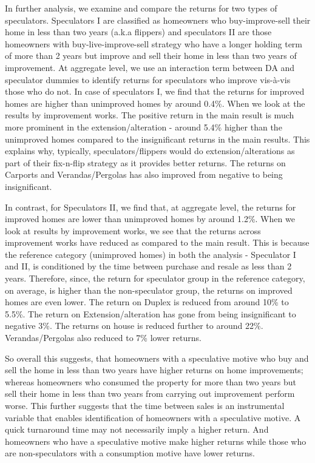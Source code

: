 \documentclass[AEJ,reqno, draftmode]{AEA} %
\begin{document}
In further analysis, we examine and compare the returns for two types of speculators. Speculators I are classified as homeowners who buy-improve-sell their home in less than two years (a.k.a flippers) and speculators II are those homeowners with buy-live-improve-sell strategy who have a longer holding term of more than 2 years but improve and sell their home in less than two years of improvement. At aggregate level, we use an interaction term between DA and speculator dummies to identify returns for speculators who improve vis-à-vis those who do not. In case of speculators I, we find that the returns for improved homes are higher than unimproved homes by around 0.4\%. When we look at the results by improvement works. The positive return in the main result is much more prominent in the extension/alteration - around 5.4\% higher than the unimproved homes compared to the insignificant returns in the main results. This explains why, typically, speculators/flippers would do extension/alterations as part of their fix-n-flip strategy as it provides better returns. The returns on Carports and Verandas/Pergolas has also improved from negative to being insignificant. 

In contrast, for Speculators II, we find that, at aggregate level, the returns for improved homes are lower than unimproved homes by around 1.2\%. When we look at results by improvement works, we see that the returns across improvement works have reduced as compared to the main result. This is because the reference category (unimproved homes) in both the analysis - Speculator I and II, is conditioned by the time between purchase and resale as less than 2 years. Therefore, since, the return for speculator group in the reference category, on average, is higher than the non-speculator group, the returns on improved homes are even lower. The return on Duplex is reduced from around 10\% to 5.5\%. The return on Extension/alteration has gone from being insignificant to negative 3\%. The returns on house is reduced further to around 22\%. Verandas/Pergolas also reduced to 7\% lower returns. 

So overall this suggests, that homeowners with a speculative motive who buy and sell the home in less than two years have higher returns on home improvements; whereas homeowners who consumed the property for more than two years but sell their home in less than two years from carrying out improvement perform worse. This further suggests that the time between sales is an instrumental variable that enables identification of homeowners with a speculative motive. A quick turnaround time may not necessarily imply a higher return. And homeowners who have a speculative motive make higher returns while those who are non-speculators with a consumption motive have lower returns. 
\end{document}
